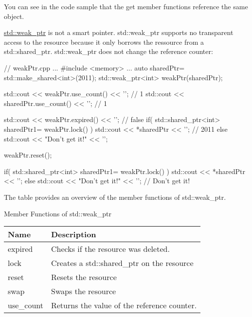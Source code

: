 You can see in the code sample that the get member functions reference the same object.


\href{http://en.cppreference.com/w/cpp/memory/weak_ptr}{std::weak\_ptr} is not a smart pointer. std::weak\_ptr supports no transparent access to the resource because it only borrows the ressource from a std::shared\_ptr. std::weak\_ptr does not change the reference counter:


\begin{cpp}
// weakPtr.cpp
...
#include <memory>
...
auto sharedPtr= std::make_shared<int>(2011);
std::weak_ptr<int> weakPtr(sharedPtr);

std::cout << weakPtr.use_count() << '\n'; // 1
std::cout << sharedPtr.use_count() << '\n'; // 1

std::cout << weakPtr.expired() << '\n'; // false
if( std::shared_ptr<int> sharedPtr1= weakPtr.lock() ) {
	std::cout << *sharedPtr << '\n'; // 2011
}
else{
	std::cout << "Don't get it!" << '\n';
}

weakPtr.reset();

if( std::shared_ptr<int> sharedPtr1= weakPtr.lock() ) {
	std::cout << *sharedPtr << '\n';
}
else{
	std::cout << "Don't get it!" << '\n'; // Don't get it!
}
\end{cpp}

The table provides an overview of the member functions of std::weak\_ptr.

\begin{center}
Member Functions of std::weak\_ptr
\end{center}

\begin{longtable}[c]{ll}
\textbf{Name} & \textbf{Description}                        \\
\endfirsthead
%
\endhead
%
expired       & Checks if the resource was deleted.         \\
lock          & Creates a std::shared\_ptr on the resource  \\
reset         & Resets the resource                         \\
swap          & Swaps the resource                          \\
use\_count    & Returns the value of the reference counter.
\end{longtable}

